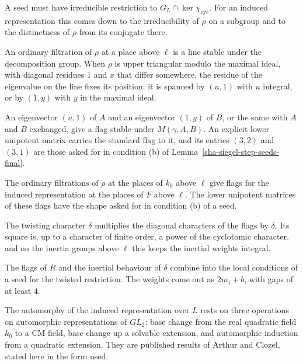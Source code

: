 A seed must have irreducible restriction to $G_L\cap\ker\chi_{\mathrm{cyc}}$. For an induced representation this comes down to the irreducibility of $\rho$ on a subgroup and to the distinctness of $\rho$ from its conjugate there.

An ordinary filtration of $\rho$ at a place above $\ell$ is a line stable under the decomposition group. When $\rho$ is upper triangular modulo the maximal ideal, with diagonal residues $1$ and $x$ that differ somewhere, the residue of the eigenvalue on the line fixes its position: it is spanned by $(u,1)$ with $u$ integral, or by $(1,y)$ with $y$ in the maximal ideal.

An eigenvector $(u,1)$ of $A$ and an eigenvector $(1,y)$ of $B$, or the same with $A$ and $B$ exchanged, give a flag stable under $M(\gamma,A,B)$. An explicit lower unipotent matrix carries the standard flag to it, and its entries $(3,2)$ and $(3,1)$ are those asked for in condition (b) of Lemma~\ref{sha-siegel-step-seeds-final}.

The ordinary filtrations of $\rho$ at the places of $k_0$ above $\ell$ give flags for the induced representation at the places of $F$ above $\ell$. The lower unipotent matrices of these flags have the shape asked for in condition (b) of a seed.

The twisting character $\delta$ multiplies the diagonal characters of the flags by $\delta$. Its square is, up to a character of finite order, a power of the cyclotomic character, and on the inertia groups above $\ell$ this keeps the inertial weights integral.

The flags of $R$ and the inertial behaviour of $\delta$ combine into the local conditions of a seed for the twisted restriction. The weights come out as $2m_i+b$, with gaps of at least $4$.

The automorphy of the induced representation over $L$ rests on three operations on automorphic representations of $GL_2$: base change from the real quadratic field $k_0$ to a CM field, base change up a solvable extension, and automorphic induction from a quadratic extension. They are published results of Arthur and Clozel, stated here in the form used.

